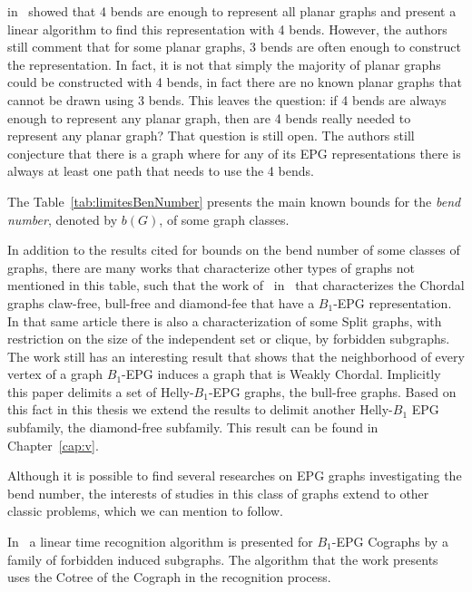 \citeauthor{daniel2014b} in~\cite{daniel2014b} showed that 4 bends are enough to represent all planar graphs and present a linear algorithm to find this representation with 4 bends. However, the authors still comment that for some planar graphs, 3 bends are often enough to construct the representation. In fact, it is not that simply the majority of planar graphs could be constructed with 4 bends, in fact there are no known planar graphs that cannot be drawn using 3 bends. This leaves the question: if 4 bends are always enough to represent any planar graph, then are 4 bends really needed to represent any planar graph? That question is still open. The authors still conjecture that there is a graph where for any of its EPG representations there is always at least one path that needs to use the 4 bends.


The Table~\ref{tab:limitesBenNumber} presents the main known bounds for the \emph{bend number}, denoted by $b(G)$, of some graph classes.





In addition to the results cited for bounds on the bend number of some classes of graphs, there are many works that characterize other types of graphs not mentioned in this table, such that the work of~\citeauthor{ries2009} in~\citep{ries2009} that characterizes the Chordal graphs  claw-free, bull-free and diamond-fee that have a $ B_{1}$-EPG representation. In that same article there is also a characterization of some Split graphs, with restriction on the size of the independent set or  clique, by forbidden subgraphs. The work still has an interesting result that shows that the neighborhood of every vertex of a graph $ B_1$-EPG induces a graph that is Weakly Chordal. Implicitly this paper delimits a set of Helly-$B_1$-EPG graphs, the bull-free graphs. Based on this fact in this thesis we extend the results to delimit another Helly-$B_1$ EPG subfamily, the diamond-free subfamily. This result can be found in Chapter~\ref{cap:v}.

Although it is possible to find several researches on EPG graphs investigating the bend number, the interests of studies in this class of graphs extend to other classic problems, which we can mention to follow.


In~\citet{cohen2014} a linear time recognition algorithm is presented for $ B_{1}$-EPG Cographs by a family of forbidden induced subgraphs. The algorithm that the work presents uses the Cotree of the Cograph in the recognition process.

